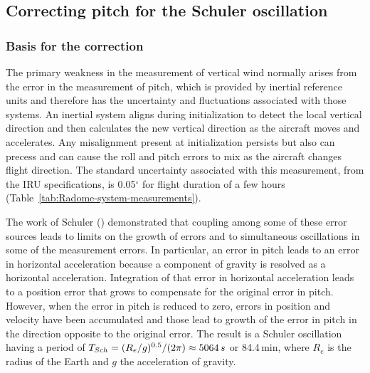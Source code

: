 \documentclass[12pt,twoside,english]{article}\usepackage[]{graphicx}\usepackage[]{color}
\let\stdsection\section
\renewcommand{\section}{\newpage\stdsection}
\let\OrgIndex\index
\renewcommand*{\index}[1]{\OrgIndex{#1}}
\begin{document}
{{\subsection{Correcting pitch for the Schuler oscillation\label{sub:Schuler}}





% 



\subsubsection{Basis for the correction}

The primary weakness in the measurement of vertical wind normally arises from the error in the measurement of pitch, which is provided by inertial reference units and therefore has the uncertainty and fluctuations associated with those systems. An inertial system aligns during initialization to detect the local vertical direction and then calculates the new vertical direction as the aircraft moves and accelerates. Any misalignment present at initialization persists but also can precess and can cause the roll and pitch errors to mix as the aircraft changes flight direction. The standard uncertainty associated with this measurement, from the IRU specifications, is 0.05$^{\circ}$ for flight duration of a few hours (Table~\ref{tab:Radome-system-measurements}).

The work of Schuler (\citet{Schuler1923}) demonstrated that coupling among some of these error sources leads to limits on the growth of errors and to simultaneous oscillations in some of the measurement errors. In particular, an error in pitch leads to an error in horizontal acceleration because a component of gravity is resolved as a horizontal acceleration. Integration of that error in horizontal acceleration leads to a position error that grows to compensate for the original error in pitch. However, when the error in pitch is reduced to zero, errors in position and velocity have been accumulated and those lead to growth of the error in pitch in the direction opposite to the original error. The result is a Schuler oscillation having a period of $T_{Sch}=(R_{e}/g)^{0.5}/(2\pi)\approx5064\thinspace s$ or 84.4\,min, where $R_{e}$ is the radius of the Earth and $g$ the acceleration of gravity. 

}}
\end{document}
